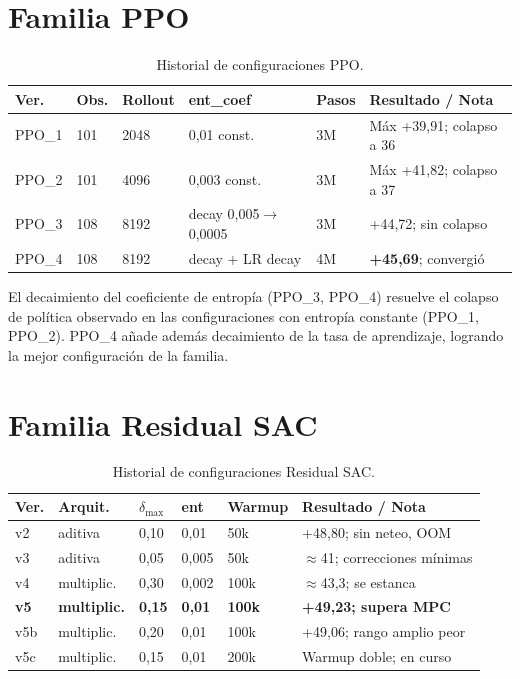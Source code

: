 \documentclass[12pt, a4paper, twoside]{report}
\begin{document}
\section{Familia PPO}

\begin{table}[H]
\centering
\caption{Historial de configuraciones PPO.}
\label{tab:hist_ppo}
\small
\begin{tabularx}{\textwidth}{lL{1.2cm}L{1.6cm}L{2.2cm}L{1cm}X}
\toprule
\textbf{Ver.} & \textbf{Obs.} & \textbf{Rollout} & \textbf{ent\_coef} &
\textbf{Pasos} & \textbf{Resultado / Nota} \\
\midrule
PPO\_1 & 101 & 2048 & 0{,}01 const. & 3M & Máx +39{,}91; colapso a 36 \\
PPO\_2 & 101 & 4096 & 0{,}003 const. & 3M & Máx +41{,}82; colapso a 37 \\
PPO\_3 & 108 & 8192 & decay 0{,}005$\to$0{,}0005 & 3M & +44{,}72; sin colapso \\
PPO\_4 & 108 & 8192 & decay + LR decay & 4M & \textbf{+45{,}69}; convergió \\
\bottomrule
\end{tabularx}
\end{table}

El decaimiento del coeficiente de entropía (PPO\_3, PPO\_4) resuelve el colapso
de política observado en las configuraciones con entropía constante (PPO\_1,
PPO\_2). PPO\_4 añade además decaimiento de la tasa de aprendizaje, logrando la
mejor configuración de la familia.

\section{Familia Residual SAC}

\begin{table}[H]
\centering
\caption{Historial de configuraciones Residual SAC.}
\label{tab:hist_sac}
\small
\begin{tabularx}{\textwidth}{lL{2cm}L{1.3cm}L{1.2cm}L{1.3cm}X}
\toprule
\textbf{Ver.} & \textbf{Arquit.} & \textbf{$\delta_{\max}$} &
\textbf{ent} & \textbf{Warmup} & \textbf{Resultado / Nota} \\
\midrule
v2 & aditiva & 0{,}10 & 0{,}01 & 50k & +48{,}80; sin neteo, OOM \\
v3 & aditiva & 0{,}05 & 0{,}005 & 50k & $\approx$41; correcciones mínimas \\
v4 & multiplic. & 0{,}30 & 0{,}002 & 100k & $\approx$43{,}3; se estanca \\
\textbf{v5} & \textbf{multiplic.} & \textbf{0{,}15} & \textbf{0{,}01} &
\textbf{100k} & \textbf{+49{,}23; supera MPC} \\
v5b & multiplic. & 0{,}20 & 0{,}01 & 100k & +49{,}06; rango amplio peor \\
v5c & multiplic. & 0{,}15 & 0{,}01 & 200k & Warmup doble; en curso \\
\bottomrule
\end{tabularx}
\end{table}
\end{document}
